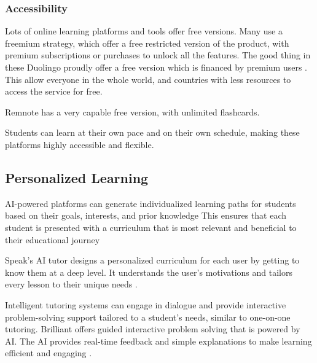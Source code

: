 \documentclass{article}
\begin{document}
\subsubsection{Accessibility}
Lots of online learning platforms and tools offer free versions.
Many use a freemium strategy, which offer a free restricted version
of the product, with premium subscriptions or purchases to unlock
all the features. The good thing in these Duolingo proudly offer
a free version which is financed by premium users
\cite{make_learning_as_addictive_as_social_media}.
This allow everyone in the whole world, and countries
with less resources to access the service for free.

Remnote has a very capable free version, with unlimited flashcards.

Students can learn at their own pace and on their own schedule,
making these platforms highly accessible and flexible.

\subsection{Personalized Learning}

AI-powered platforms can generate individualized learning paths for
students based on their goals, interests, and prior knowledge
This ensures that each student is presented with a curriculum that is most relevant and beneficial to their educational journey

Speak's AI tutor designs a personalized curriculum for each user by getting to know them at a deep level. It understands the user's motivations and tailors every lesson to their unique needs \cite{https://www.speak.com/}.

Intelligent tutoring systems can engage in dialogue and provide interactive problem-solving support tailored to a student's needs, similar to one-on-one tutoring. Brilliant offers guided interactive problem solving that is powered by AI. The AI provides real-time feedback and simple explanations to make learning efficient and engaging \cite{https://brilliant.org/}.
\end{document}
